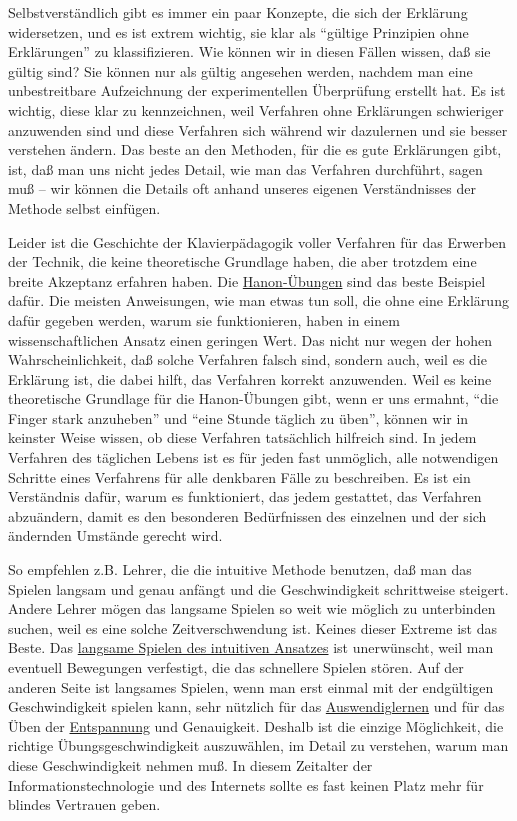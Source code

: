 Selbstverständlich gibt es immer ein paar Konzepte, die sich der Erklärung widersetzen, und es ist extrem wichtig, sie klar als \enquote{gültige Prinzipien ohne Erklärungen} zu klassifizieren.
Wie können wir in diesen Fällen wissen, daß sie gültig sind?
Sie können nur als gültig angesehen werden, nachdem man eine unbestreitbare Aufzeichnung der experimentellen Überprüfung erstellt hat.
Es ist wichtig, diese klar zu kennzeichnen, weil Verfahren ohne Erklärungen schwieriger anzuwenden sind und diese Verfahren sich während wir dazulernen und sie besser verstehen ändern.
Das beste an den Methoden, für die es gute Erklärungen gibt, ist, daß man uns nicht jedes Detail, wie man das Verfahren durchführt, sagen muß -- wir können die Details oft anhand unseres eigenen Verständnisses der Methode selbst einfügen.

Leider ist die Geschichte der Klavierpädagogik voller Verfahren für das Erwerben der Technik, die keine theoretische Grundlage haben, die aber trotzdem eine breite Akzeptanz erfahren haben.
Die \hyperref[c1iii7h]{Hanon-Übungen} sind das beste Beispiel dafür.
Die meisten Anweisungen, wie man etwas tun soll, die ohne eine Erklärung dafür gegeben werden, warum sie funktionieren, haben in einem wissenschaftlichen Ansatz einen geringen Wert.
Das nicht nur wegen der hohen Wahrscheinlichkeit, daß solche Verfahren falsch sind, sondern auch, weil es die Erklärung ist, die dabei hilft, das Verfahren korrekt anzuwenden.
Weil es keine theoretische Grundlage für die Hanon-Übungen gibt, wenn er uns ermahnt, \enquote{die Finger stark anzuheben} und \enquote{eine Stunde täglich zu üben}, können wir in keinster Weise wissen, ob diese Verfahren tatsächlich hilfreich sind.
In jedem Verfahren des täglichen Lebens ist es für jeden fast unmöglich, alle notwendigen Schritte eines Verfahrens für alle denkbaren Fälle zu beschreiben.
Es ist ein Verständnis dafür, warum es funktioniert, das jedem gestattet, das Verfahren abzuändern, damit es den besonderen Bedürfnissen des einzelnen und der sich ändernden Umstände gerecht wird.

So empfehlen z.B. Lehrer, die die intuitive Methode benutzen, daß man das Spielen langsam und genau anfängt und die Geschwindigkeit schrittweise steigert.
Andere Lehrer mögen das langsame Spielen so weit wie möglich zu unterbinden suchen, weil es eine solche Zeitverschwendung ist.
Keines dieser Extreme ist das Beste.
Das \hyperref[c1ii16]{langsame Spielen des intuitiven Ansatzes} ist unerwünscht, weil man eventuell Bewegungen verfestigt, die das schnellere Spielen stören.
Auf der anderen Seite ist langsames Spielen, wenn man erst einmal mit der endgültigen Geschwindigkeit spielen kann, sehr nützlich für das \hyperref[c1iii6h]{Auswendiglernen} und für das Üben der \hyperref[c1ii14]{Entspannung} und Genauigkeit.
Deshalb ist die einzige Möglichkeit, die richtige Übungsgeschwindigkeit auszuwählen, im Detail zu verstehen, warum man diese Geschwindigkeit nehmen muß.
In diesem Zeitalter der Informationstechnologie und des Internets sollte es fast keinen Platz mehr für blindes Vertrauen geben.

